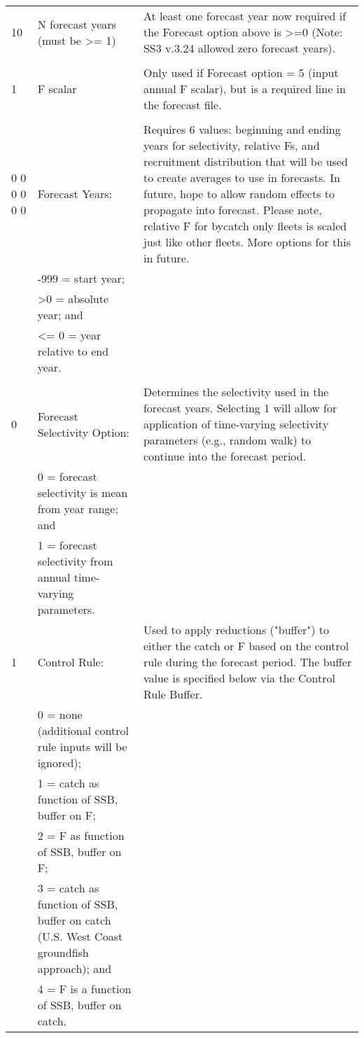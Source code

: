 \begin{landscape}
{\begin{longtable}{p{3.2cm} p{7cm} p{10.8cm}}
  \hline
  10 & N forecast years (must be >= 1) &  \multirow{1}{1cm}[-0.25cm]{\parbox{11cm }{ At least one forecast year now required if the Forecast option above is >=0 (Note: SS3 v.3.24 allowed zero forecast years).}} \Tstrut\\
     & & \Bstrut\\
     
  \hline
  1 & F scalar & \multirow{1}{1cm}[-0.10cm]{\parbox{11cm}{Only used if Forecast option = 5 (input annual F scalar), but is a required line in the forecast file.}}\Tstrut\Bstrut\\
  & & \\
  
  \hline
  0 0 0 0 0 0 & Forecast Years: &  \multirow{1}{1cm}[-0.25cm]{\parbox{11cm}{Requires 6 values: beginning and ending years for selectivity, relative Fs, and recruitment distribution that will be used to create averages to use in forecasts.  In future, hope to allow random effects to propagate into forecast. Please note, relative F for bycatch only fleets is scaled just like other fleets.  More options for this in future.}}\Tstrut\\
    & -999 = start year; & \\
	& >0 = absolute year; and & \\
    & <= 0 = year relative to end year. & \\
    & & \Bstrut\\  

 \pagebreak   
 0 & Forecast Selectivity Option: & \multirow{1}{1cm}[-0.25cm]{\parbox{11cm}{Determines the selectivity used in the forecast years. Selecting 1 will allow for application of time-varying selectivity parameters (e.g., random walk) to continue into the forecast period.}}\Tstrut\\
   & 0 = forecast selectivity is mean from year range; and & \\
   & 1 = forecast selectivity from annual time-varying parameters. & \Bstrut\\

 \hline   
 1 & Control Rule: & \multirow{1}{1cm}[-0.25cm]{\parbox{11cm}{Used to apply reductions ("buffer") to either the catch or F based on the control rule during the forecast period. The buffer value is specified below via the Control Rule Buffer.}} \Tstrut\\
   & 0 = none (additional control rule inputs will be ignored); & \\
   & 1 = catch as function of SSB, buffer on F; & \\
   & 2 = F as function of SSB, buffer on F; & \\
   & 3 = catch as function of SSB, buffer on catch (U.S. West Coast groundfish approach); and & \\
   & 4 = F is a function of SSB, buffer on catch. & \Bstrut\\
 \hline
 


\end{longtable}}
\end{landscape}

